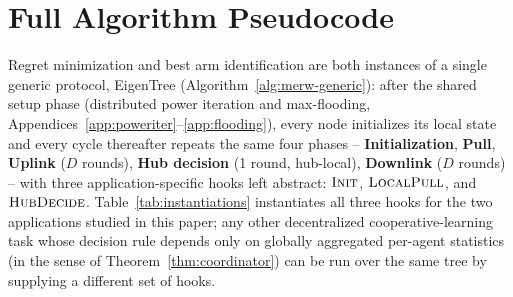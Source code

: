 \documentclass{article}
\newcommand{\merw}{EigenTree}
\begin{document}
\section{Full Algorithm Pseudocode}
\label{app:pseudocode}

Regret minimization and best arm identification are both instances of a single generic protocol, \merw{} (Algorithm~\ref{alg:merw-generic}): after the shared setup phase (distributed power iteration and max-flooding, Appendices~\ref{app:poweriter}--\ref{app:flooding}), every node initializes its local state and every cycle thereafter repeats the same four phases -- \textbf{Initialization}, \textbf{Pull}, \textbf{Uplink} ($D$ rounds), \textbf{Hub decision} (1 round, hub-local), \textbf{Downlink} ($D$ rounds) -- with three application-specific hooks left abstract: $\textsc{Init}$, $\textsc{LocalPull}$, and $\textsc{HubDecide}$. Table~\ref{tab:instantiations} instantiates all three hooks for the two applications studied in this paper; any other decentralized cooperative-learning task whose decision rule depends only on globally aggregated per-agent statistics (in the sense of Theorem~\ref{thm:coordinator}) can be run over the same tree by supplying a different set of hooks.
\end{document}

